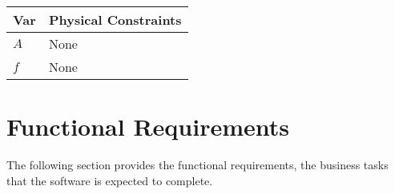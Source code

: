 \documentclass[12pt]{article}
\begin{document}
\begin{table}[!h]
\caption{Output Variables} \label{TblOutputVar}
\renewcommand{\arraystretch}{1.2}
\noindent \begin{longtable*}{l l} 
  \toprule
  \textbf{Var} & \textbf{Physical Constraints} \\
  \midrule 
  $A$ & None\\
  $f$ & None\\
  \bottomrule
\end{longtable*}
\end{table}

\section{Functional Requirements} \label{Func}

The following section provides the functional requirements, the business tasks
that the software is expected to complete.  

\end{document}
